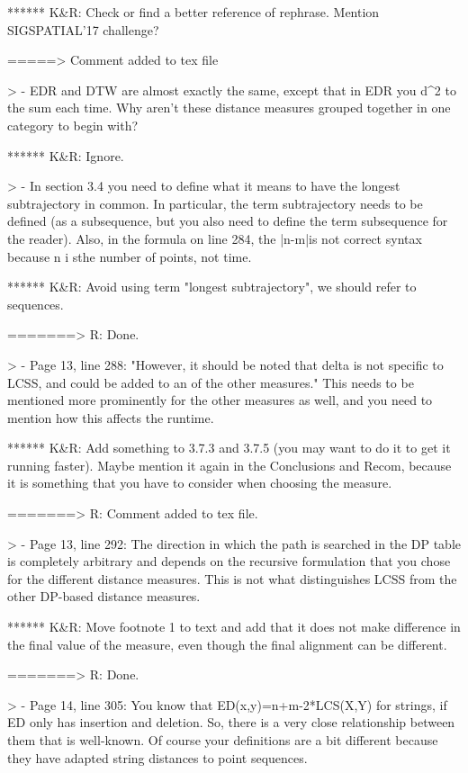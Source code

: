 ****** K&R: Check or  find a better reference of rephrase. Mention SIGSPATIAL'17 challenge?

=====> Comment added to tex file


> - EDR and DTW are almost exactly the same, except that in EDR you d^2 to the sum each time. Why aren't these distance measures grouped together in one category to begin with?

****** K&R: Ignore.


> - In section 3.4 you need to define what it means to have the longest subtrajectory in common. In particular, the term subtrajectory needs to be defined (as a subsequence, but you also need to define the term subsequence for the reader). Also, in the formula on line 284, the |n-m|\leq\delta is not correct syntax because n i sthe number of points, not time.

****** K&R: Avoid using term "longest subtrajectory", we should refer to sequences.

=======> R: Done.


> - Page 13, line 288: "However, it should be noted that delta is not specific to LCSS, and could be added to an of the other measures." This needs to be mentioned more prominently for the other measures as well, and you need to mention how this affects the runtime.

****** K&R: Add something to 3.7.3 and 3.7.5 (you may want to do it to get it running faster). Maybe mention it again in the Conclusions and Recom, because it is something that you have to consider when choosing the measure.

=======> R: Comment added to tex file.


> - Page 13, line 292: The direction in which the path is searched in the DP table is completely arbitrary and depends on the recursive formulation that you chose for the different distance measures. This is not what distinguishes LCSS from the other DP-based distance measures.

****** K&R: Move footnote 1 to text and add that it does not make  difference in the final value of the measure, even though the final alignment can be different.

=======> R: Done.

> - Page 14, line 305: You know that ED(x,y)=n+m-2*LCS(X,Y) for strings, if ED only has insertion and deletion. So, there is a very close relationship between them that is well-known. Of course your definitions are a bit different because they have adapted string distances to point sequences.


